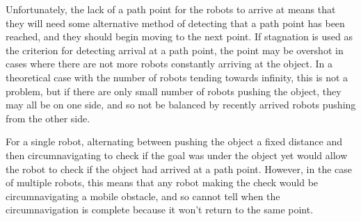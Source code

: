 Unfortunately, the lack of a path point for the robots to arrive at means that they will need some alternative method of detecting that a path point has been reached, and they should begin moving to the next point. 
If stagnation is used as the criterion for detecting arrival at a path point, the point may be overshot in cases where there are not more robots constantly arriving at the object.
In a theoretical case with the number of robots tending towards infinity, this is not a problem, but if there are only small number of robots pushing the object, they may all be on one side, and so not be balanced by recently arrived robots pushing from the other side. 

For a single robot, alternating between pushing the object a fixed distance and then circumnavigating to check if the goal was under the object yet would allow the robot to check if the object had arrived at a path point. However, in the case of multiple robots, this means that any robot making the check would be circumnavigating a mobile obstacle, and so cannot tell when the circumnavigation is complete because it won't return to the same point. 

